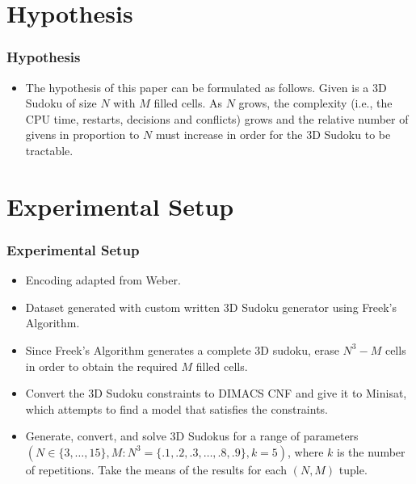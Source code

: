 \documentclass{beamer}
\begin{document}

\section{Hypothesis}
\begin{frame}
\frametitle{Hypothesis}
\begin{itemize}
	\item The hypothesis of this paper can be formulated as follows. Given is a 3D Sudoku of size $N$ with $M$ filled cells. As $N$ grows, the complexity (i.e., the CPU time, restarts, decisions and conflicts) grows and the relative number of givens in proportion to $N$ must increase in order for the 3D Sudoku to be tractable.
\end{itemize}
\end{frame}

\section{Experimental Setup}
\begin{frame}
\frametitle{Experimental Setup}
\begin{itemize}
 \item Encoding adapted from Weber.
 \item Dataset generated with custom written 3D Sudoku generator using Freek's Algorithm.
 \item Since Freek's Algorithm generates a complete 3D sudoku, erase $N^3 - M$ cells in order to obtain the required $M$ filled cells.
 \item Convert the 3D Sudoku constraints to DIMACS CNF and give it to Minisat, which attempts to find a model that satisfies the constraints.
 \item Generate, convert, and solve 3D Sudokus for a range of parameters $(N \in \{3, \hdots, 15\}, M:N^3 = \{.1, .2, .3, \hdots, .8, .9\}, k = 5)$, where $k$ is the number of repetitions. Take the means of the results for each $(N, M)$ tuple.
\end{itemize}
\end{frame}
\end{document}
